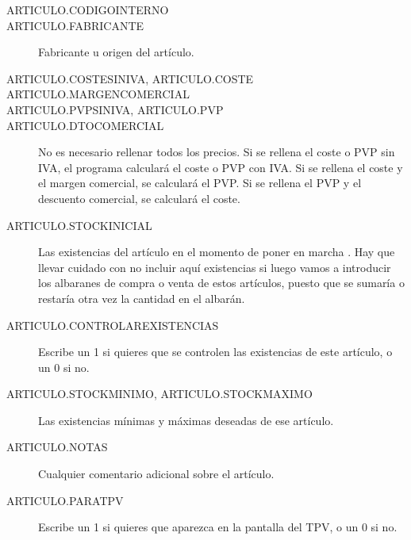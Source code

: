 \begin{description}
 \item [ARTICULO.CODIGOINTERNO]
 \item [ARTICULO.FABRICANTE] {Fabricante u origen del artículo.}
 \item [ARTICULO.COSTESINIVA, ARTICULO.COSTE] {}
 \item [ARTICULO.MARGENCOMERCIAL] {}
 \item [ARTICULO.PVPSINIVA, ARTICULO.PVP] {}
 \item [ARTICULO.DTOCOMERCIAL] {}
 \item []  {\par No es necesario rellenar todos los precios. Si se rellena el coste o PVP sin IVA, el programa calculará el coste o PVP con IVA. Si se rellena el coste y el margen comercial, se calculará el PVP. Si se rellena el PVP y el descuento comercial, se calculará el coste.}
 \item [ARTICULO.STOCKINICIAL] {Las existencias del artículo en el momento de poner en marcha \appname. Hay que llevar cuidado con no incluir aquí existencias si luego vamos a introducir los albaranes de compra o venta de estos artículos, puesto que se sumaría o restaría otra vez la cantidad en el albarán.}
 \item [ARTICULO.CONTROLAREXISTENCIAS] {Escribe un 1 si quieres que se controlen las existencias de este artículo, o un 0 si no.}
 \item [ARTICULO.STOCKMINIMO, ARTICULO.STOCKMAXIMO] {Las existencias mínimas y máximas deseadas de ese artículo.}
 \item [ARTICULO.NOTAS] {Cualquier comentario adicional sobre el artículo.}
 \item [ARTICULO.PARATPV] {Escribe un 1 si quieres que aparezca en la pantalla del TPV, o un 0 si no.}
\end{description}

% 
% 
% 
% 
% 


